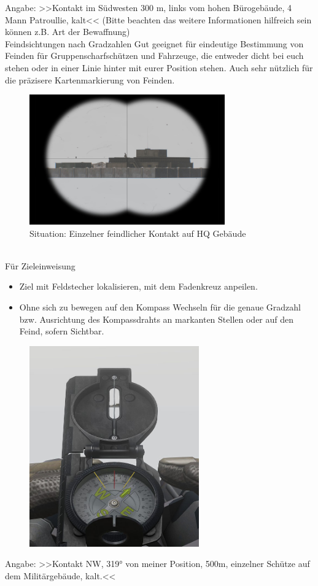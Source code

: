 Angabe: >>Kontakt im Südwesten 300 m, links vom hohen Bürogebäude, 4 Mann Patroullie, kalt<< (Bitte beachten das weitere Informationen hilfreich sein können z.B. Art der Bewaffnung)\\

Feindsichtungen nach Gradzahlen
Gut geeignet für eindeutige Bestimmung von Feinden für Gruppenscharfschützen und Fahrzeuge, die entweder dicht bei euch stehen oder in einer Linie hinter mit eurer Position stehen. Auch sehr nützlich für die präzisere Kartenmarkierung von Feinden.
\begin{figure}[!h]
	\centering
	\includegraphics[width=0.75\textwidth]{../img/advanced/kartenarbeit/kompass3}
	\caption{Situation: Einzelner feindlicher Kontakt auf HQ Gebäude}
\end{figure}\\

Für Zieleinweisung
\begin{itemize}
	\item Ziel mit Feldstecher lokalisieren, mit dem Fadenkreuz anpeilen.
	\item Ohne sich zu bewegen auf den Kompass Wechseln für die genaue Gradzahl bzw. Ausrichtung des Kompassdrahts an markanten Stellen oder auf den Feind, sofern Sichtbar.
\end{itemize}

\begin{figure}[!h]
	\centering
	\includegraphics[width=0.65\textwidth]{../img/advanced/kartenarbeit/kompass4}
\end{figure}
Angabe: >>Kontakt NW, 319° von meiner Position, 500m, einzelner Schütze auf dem Militärgebäude, kalt.<<\\


